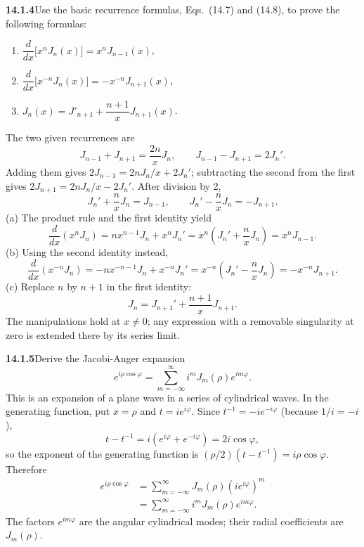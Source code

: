 \par\bigskip
\noindent\textbf{14.1.4}\quad Use the basic recurrence formulas,
Eqs.~(14.7) and (14.8), to prove the following formulas:
\begin{enumerate}
\item[(a)] $\dfrac{d}{dx}\big[x^{n}J_{n}(x)\big]=x^{n}J_{n-1}(x)$,
\item[(b)] $\dfrac{d}{dx}\big[x^{-n}J_{n}(x)\big]=-x^{-n}J_{n+1}(x)$,
\item[(c)] $J_{n}(x)=J'_{n+1}+\dfrac{n+1}{x}J_{n+1}(x)$.
\end{enumerate}
\solution
The two given recurrences are
\[
J_{n-1}+J_{n+1}=\frac{2n}{x}J_n,
\qquad J_{n-1}-J_{n+1}=2J_n'.
\]
Adding them gives $2J_{n-1}=2nJ_n/x+2J_n'$; subtracting the second
from the first gives $2J_{n+1}=2nJ_n/x-2J_n'$. After division by 2,
\[
J_n'+\frac n{x}J_n=J_{n-1},\qquad
J_n'-\frac n{x}J_n=-J_{n+1}.
\]
(a) The product rule and the first identity yield
\[
\frac d{dx}(x^nJ_n)
=nx^{n-1}J_n+x^nJ_n'
=x^n\left(J_n'+\frac n{x}J_n\right)
=\boxed{x^nJ_{n-1}}.
\]
(b) Using the second identity instead,
\[
\frac d{dx}(x^{-n}J_n)
=-nx^{-n-1}J_n+x^{-n}J_n'
=x^{-n}\left(J_n'-\frac n{x}J_n\right)
=\boxed{-x^{-n}J_{n+1}}.
\]
(c) Replace $n$ by $n+1$ in the first identity:
\[
\boxed{J_n=J_{n+1}'+\frac{n+1}{x}J_{n+1}.}
\]
The manipulations hold at $x\ne0$; any expression with a removable
singularity at zero is extended there by its series limit.

\par\bigskip
\noindent\textbf{14.1.5}\quad Derive the Jacobi-Anger expansion
\[
e^{i\rho\cos\varphi}=\sum_{m=-\infty}^{\infty}i^{m}J_{m}(\rho)e^{im\varphi}.
\]
This is an expansion of a plane wave in a series of cylindrical waves.
\solution
In the generating function, put $x=\rho$ and $t=i e^{i\varphi}$.
Since $t^{-1}=-i e^{-i\varphi}$ (because $1/i=-i$),
\[
t-t^{-1}=i(e^{i\varphi}+e^{-i\varphi})=2i\cos\varphi,
\]
so the exponent of the generating function is
$(\rho/2)(t-t^{-1})=i\rho\cos\varphi$. Therefore
\begin{align*}
e^{i\rho\cos\varphi}
&=\sum_{m=-\infty}^{\infty}J_m(\rho)(i e^{i\varphi})^m\\
&=\boxed{\sum_{m=-\infty}^{\infty}i^mJ_m(\rho)e^{im\varphi}}.
\end{align*}
The factors $e^{im\varphi}$ are the angular cylindrical modes; their
radial coefficients are $J_m(\rho)$.

